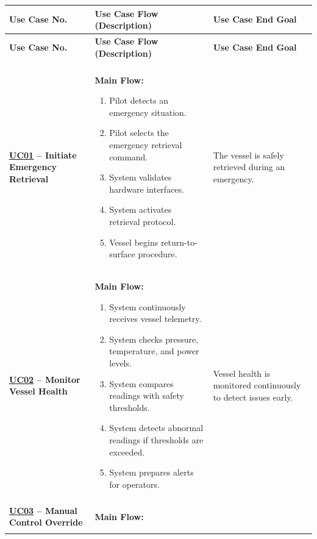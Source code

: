 \documentclass[11pt,a4paper]{article}
\let\orighyperref\hyperref
\renewcommand{\hyperref}[2][]{\orighyperref[#1]{\uline{#2}}}%
\begin{document}
\small
\renewcommand{\arraystretch}{1.2}
\setlength{\tabcolsep}{4pt}
\begin{longtable}{|>{\raggedright\arraybackslash}p{}|>{\raggedright\arraybackslash}p{}|>{\raggedright\arraybackslash}p{}|}
\hline
\rowcolor{tableheader}
\textbf{Use Case No.} & \textbf{Use Case Flow (Description)} & \textbf{Use Case End Goal} \\
\hline
\endfirsthead
\hline
\rowcolor{tableheader}
\textbf{Use Case No.} & \textbf{Use Case Flow (Description)} & \textbf{Use Case End Goal} \\
\hline
\endhead
\hline \multicolumn{3}{r}{{Continued on next page}} \\ \hline
\endfoot
\hline
\endlastfoot

\textbf{\hyperref[fig:usecase-diagram-pdf]{UC01} -- Initiate Emergency Retrieval} & \textbf{Main Flow:}\begin{enumerate}[leftmargin=*,nosep]
  \item Pilot detects an emergency situation.
  \item Pilot selects the emergency retrieval command.
  \item System validates hardware interfaces.
  \item System activates retrieval protocol.
  \item Vessel begins return-to-surface procedure.
\end{enumerate} & The vessel is safely retrieved during an emergency. \\
\hline
\textbf{\hyperref[fig:usecase-diagram-pdf]{UC02} -- Monitor Vessel Health} & \textbf{Main Flow:}\begin{enumerate}[leftmargin=*,nosep]
  \item System continuously receives vessel telemetry.
  \item System checks pressure, temperature, and power levels.
  \item System compares readings with safety thresholds.
  \item System detects abnormal readings if thresholds are exceeded.
  \item System prepares alerts for operators.
\end{enumerate} & Vessel health is monitored continuously to detect issues early. \\
\hline
\textbf{\hyperref[fig:usecase-diagram-pdf]{UC03} -- Manual Control Override} & \textbf{Main Flow:}\begin{enumerate}[leftmargin=*,nosep]

\end{enumerate}
\end{longtable}
\end{document}
